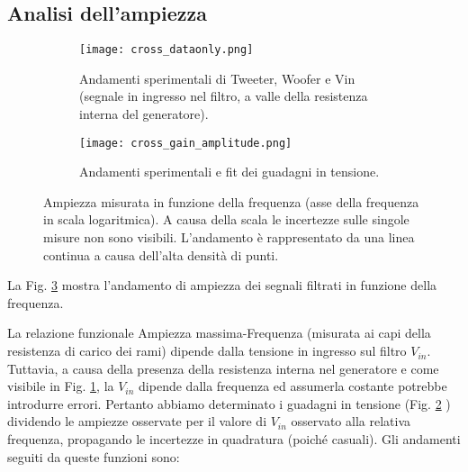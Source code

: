 \documentclass[../Relazione_circuiti]{subfiles}
\begin{document}
\subsection{Analisi dell'ampiezza}

  \begin{figure}[H]
    \centering

    \begin{subfigure}[t]{=0.49\textwidth}

      \texttt{[image: cross\_dataonly.png]}

      \caption{Andamenti sperimentali di Tweeter, Woofer e Vin (segnale in ingresso nel filtro,
        a valle della resistenza interna del generatore).}
      \label{fig: amplitude_dataonly}

    \end{subfigure}
    \hfill
    \begin{subfigure}[t]{=0.49\textwidth}

      \texttt{[image: cross\_gain\_amplitude.png]}

      \caption
      {Andamenti sperimentali e fit dei guadagni in tensione.}
      \label{fig:cross_gain}
    \end{subfigure}

    \caption{Ampiezza misurata in funzione della frequenza (asse della frequenza in scala logaritmica). A causa della scala le incertezze sulle singole misure non sono visibili. L'andamento è rappresentato da una
      linea continua a causa dell'alta densità di punti.}
    \label{fig:cross_amplitude}

  \end{figure}

  La Fig. \ref{fig:cross_amplitude} mostra l'andamento di ampiezza dei segnali filtrati in funzione della frequenza.

  La relazione funzionale Ampiezza massima-Frequenza (misurata ai capi della resistenza di carico dei rami) dipende
  dalla tensione in ingresso sul filtro $V_{in}$.
  Tuttavia, a causa della presenza della resistenza interna nel generatore e come visibile in Fig.
  \ref{fig: amplitude_dataonly}, la $V_{in}$
  dipende dalla frequenza ed assumerla costante potrebbe introdurre errori.
  Pertanto abbiamo determinato i guadagni in tensione (Fig. \ref{fig:cross_gain}
  ) dividendo le ampiezze osservate per il valore di $V_{in}$
  osservato alla relativa frequenza, propagando le incertezze in quadratura (poiché casuali). Gli andamenti seguiti da queste funzioni sono: 
\end{document}
